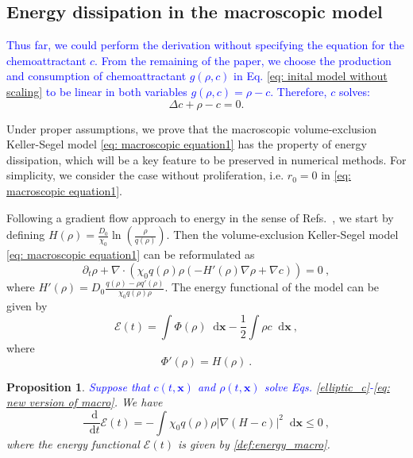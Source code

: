 \documentclass{article}
\newtheorem{proposition}{Proposition}
\newcommand {\bx} { {\mathbf{x}} }
\newcommand*\diff{\mathop{}\!\mathrm{d}}
\begin{document}
\subsection{Energy dissipation in the macroscopic model} \label{subsec:energy}
\textcolor{blue}{Thus far, we could perform the derivation without specifying the equation for the chemoattractant $c$. From the remaining of the paper, we choose the production and consumption of chemoattractant $g(\rho,c)$ in Eq. \eqref{eq: inital model without scaling} to be linear in both variables $g(\rho,c) = \rho - c$. Therefore, $c$ solves:}
\begin{equation}\label{elliptic_c}
   \Delta c + \rho - c = 0. 
\end{equation}

Under proper assumptions, we prove that the macroscopic volume-exclusion Keller-Segel model \eqref{eq: macroscopic equation1} has the property of energy dissipation, which will be a key feature to be preserved in numerical methods.
 For simplicity, we consider the case without proliferation, i.e. $r_0 = 0$ in \eqref{eq: macroscopic equation1}. 

Following a gradient flow approach to energy in the sense of Refs.~\cite{calvez2006volume,carrillo2001entropy,de2018energy}, we start by defining $H(\rho) = \frac{D_0}{\chi_0}\ln\left(\frac{\rho}{q(\rho)}\right)$. %
Then the volume-exclusion Keller-Segel model \eqref{eq: macroscopic equation1} can be reformulated as 
\begin{equation}
    \partial_t\rho+\nabla\cdot(\chi_0 q(\rho)\rho(-H'(\rho)\nabla\rho+\nabla c))= 0\ , \label{eq: new version of macro}
\end{equation}
where $H'(\rho)=D_0\frac{q(\rho)-\rho q'(\rho)}{\chi_0 q(\rho)\rho}$.
The energy functional of the model can be given by {{
\begin{equation}\label{def:energy_macro}
    \mathcal{E}(t)=\int\Phi(\rho)\diff \mathbf{x}-\frac{1}{2}\int\rho c\diff \mathbf{x}\ ,
\end{equation}
}}
where 
\begin{equation}\label{functionPhi}
    \Phi'(\rho)=H(\rho)\ .
\end{equation}


\begin{proposition}\label{prop:energy}
\textcolor{blue}{Suppose that $c(t,\mathbf{x})$ and $\rho(t,\mathbf{x})$ solve Eqs. \eqref{elliptic_c}-\eqref{eq: new version of macro}}. We have
\begin{equation}
    \frac{\diff}{\diff t}\mathcal{E}(t)=-\int \chi_0 q(\rho)\rho|\nabla(H-c)|^2\diff \bx\leq 0\ ,
\end{equation}
where the energy functional $\mathcal{E}(t)$ is given by \eqref{def:energy_macro}.
\end{proposition}
\end{document}
